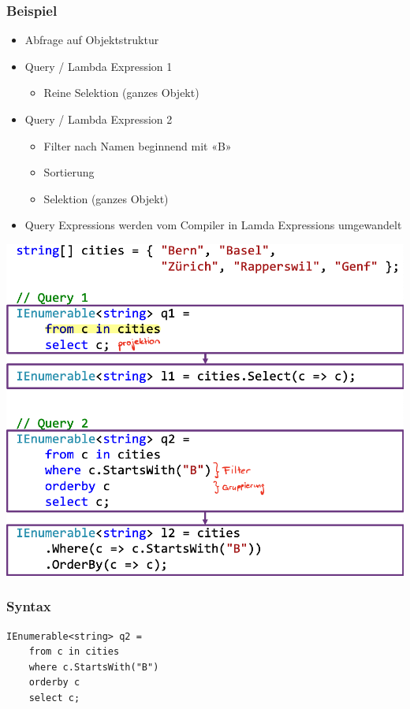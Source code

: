 \subsubsection{Beispiel}
\begin{itemize}
    \item  Abfrage auf Objektstruktur
    \item Query / Lambda Expression 1
    \begin{itemize}
        \item Reine Selektion (ganzes Objekt)
    \end{itemize}
    \item Query / Lambda Expression 2
    \begin{itemize}
        \item Filter nach Namen beginnend mit «B»
        \item Sortierung
        \item Selektion (ganzes Objekt)
    \end{itemize}
    \item Query Expressions werden vom Compiler in Lamda Expressions umgewandelt
\end{itemize}
\vspace{-8pt}
\begin{center}
    \includegraphics[scale=.35]{graphic/linq/Beispiel LINQ to Objects.png}
\end{center}
\vspace{-8pt}

\subsubsection{Syntax}
\begin{lstlisting}
IEnumerable<string> q2 =
    from c in cities
    where c.StartsWith("B")
    orderby c
    select c;
\end{lstlisting}


